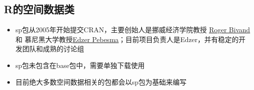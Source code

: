 \subsection{R的空间数据类}
\begin{frame}[t]{\subsecname}{}
\begin{itemize}
\item<1-> sp包从2005年开始提交CRAN，主要创始人是挪威经济学院教授
\href{https://www.nhh.no/en/employees/faculty/roger-bivand/}{\uline{Roger Bivand}}和
慕尼黑大学教授\href{https://www.uni-muenster.de/Geoinformatics/en/institute/staff/index.php/119/Edzer_Pebesma}{\uline{Edzer Pebesma}}；目前项目负责人是Edzer，并有稳定的开发团队和成熟的讨论组
\item<2-> sp包未包含在base包中，需要单独下载使用
\item<3-> 目前绝大多数空间数据相关的包都会以sp包为基础来编写
\end{itemize}

\begin{overlayarea}{\textwidth}{\textheight}

\end{overlayarea}
\end{frame}

